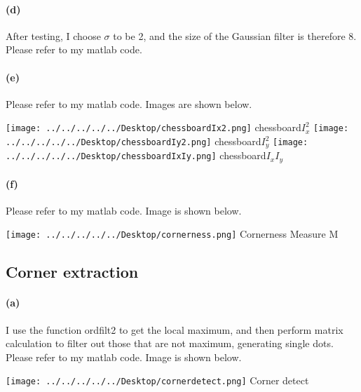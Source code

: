 \documentclass[11pt, oneside]{article}   	%
\begin{document}
\paragraph{(d)} After testing, I choose $\sigma$ to be 2, and the size of the Gaussian filter is therefore 8. Please refer to my matlab code.

\paragraph{(e)} Please refer to my matlab code. Images are shown below.
\begin{center}
\texttt{[image: ../../../../../Desktop/chessboardIx2.png]}
\newline{}chessboard$I_{x}^2$\newline\newline
\texttt{[image: ../../../../../Desktop/chessboardIy2.png]}
\newline{}chessboard$I_{y}^2$\newline\newline
\texttt{[image: ../../../../../Desktop/chessboardIxIy.png]}
\newline{}chessboard$I_{x}I_{y}$\newline\newline
\end{center}

\paragraph{(f)} Please refer to my matlab code. Image is shown below.
\begin{center}
\texttt{[image: ../../../../../Desktop/cornerness.png]}
\newline{}Cornerness Measure M\newline\newline
\end{center}

\subsection{Corner extraction}
\paragraph{(a)} I use the function ordfilt2 to get the local maximum, and then perform matrix calculation to filter out those that are not maximum, generating single dots. Please refer to my matlab code. Image is shown below.
\begin{center}
\texttt{[image: ../../../../../Desktop/cornerdetect.png]}
\newline{}Corner detect\newline\newline
\end{center}
\end{document}
